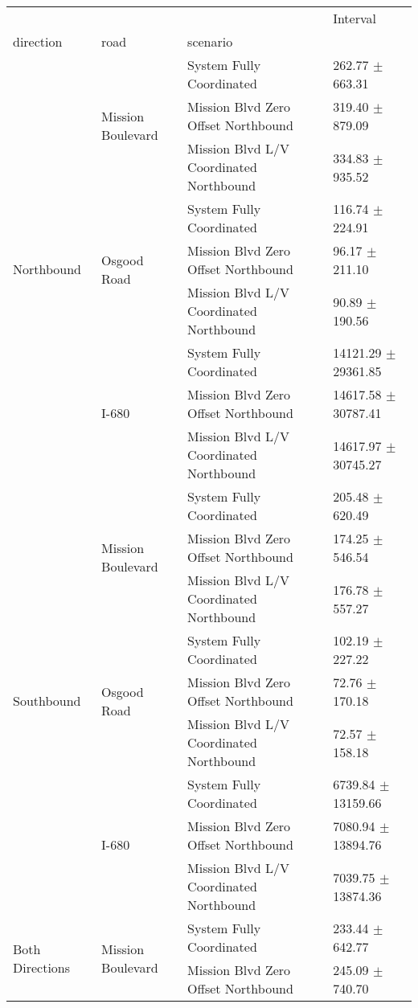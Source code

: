 \begin{tabular}{llll}
\toprule
 &  &  & Interval \\
direction & road & scenario &  \\
\midrule
\multirow[t]{9}{*}{Northbound} & \multirow[t]{3}{*}{Mission Boulevard} & System Fully Coordinated & 262.77 $\pm$ 663.31 \\
 &  & Mission Blvd Zero Offset Northbound & 319.40 $\pm$ 879.09 \\
 &  & Mission Blvd L/V Coordinated Northbound & 334.83 $\pm$ 935.52 \\
 & \multirow[t]{3}{*}{Osgood Road} & System Fully Coordinated & 116.74 $\pm$ 224.91 \\
 &  & Mission Blvd Zero Offset Northbound & 96.17 $\pm$ 211.10 \\
 &  & Mission Blvd L/V Coordinated Northbound & 90.89 $\pm$ 190.56 \\
 & \multirow[t]{3}{*}{I-680} & System Fully Coordinated & 14121.29 $\pm$ 29361.85 \\
 &  & Mission Blvd Zero Offset Northbound & 14617.58 $\pm$ 30787.41 \\
 &  & Mission Blvd L/V Coordinated Northbound & 14617.97 $\pm$ 30745.27 \\
\multirow[t]{9}{*}{Southbound} & \multirow[t]{3}{*}{Mission Boulevard} & System Fully Coordinated & 205.48 $\pm$ 620.49 \\
 &  & Mission Blvd Zero Offset Northbound & 174.25 $\pm$ 546.54 \\
 &  & Mission Blvd L/V Coordinated Northbound & 176.78 $\pm$ 557.27 \\
 & \multirow[t]{3}{*}{Osgood Road} & System Fully Coordinated & 102.19 $\pm$ 227.22 \\
 &  & Mission Blvd Zero Offset Northbound & 72.76 $\pm$ 170.18 \\
 &  & Mission Blvd L/V Coordinated Northbound & 72.57 $\pm$ 158.18 \\
 & \multirow[t]{3}{*}{I-680} & System Fully Coordinated & 6739.84 $\pm$ 13159.66 \\
 &  & Mission Blvd Zero Offset Northbound & 7080.94 $\pm$ 13894.76 \\
 &  & Mission Blvd L/V Coordinated Northbound & 7039.75 $\pm$ 13874.36 \\
\multirow[t]{9}{*}{Both Directions} & \multirow[t]{3}{*}{Mission Boulevard} & System Fully Coordinated & 233.44 $\pm$ 642.77 \\
 &  & Mission Blvd Zero Offset Northbound & 245.09 $\pm$ 740.70 \\

\end{tabular}
